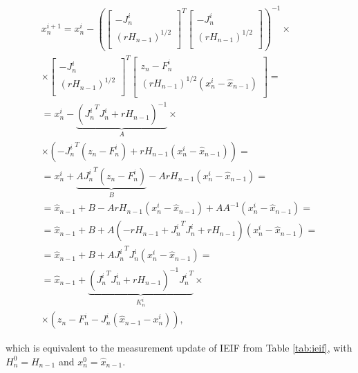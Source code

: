  \begin{align*}
x_n^{i + 1}= x_n^{i} - \left(
\left[
	\begin{array}{cc}
		- J_n^i \\
		\left(r H_{n - 1}\right)^{1/2} \\
	\end{array}
\right]^T 
\left[
	\begin{array}{c}
		- J_n^i \\
		\left(r H_{n - 1}\right)^{1/2} \\
	\end{array}
\right]
\right)^{-1} \times\\
\times \left[
	\begin{array}{cc}
		- J_n^i \\
		\left(r H_{n - 1}\right)^{1/2} \\
	\end{array}
\right]^T 
\left[
	\begin{array}{c}
		z_n - F_n^i \\
		\left(r H_{n - 1}\right)^{1/2}(x_n^i - \hat{x}_{n - 1}) \\
	\end{array}
\right] = \\
= x_n^{i} - \underbrace{\left({J_n^i}^T J_n^i + r H_{n - 1}\right)^{-1}}_{A} \times \\
\times \left( - {J_n^i}^T(z_n - F_n^i) + r H_{n - 1}(x_n^i - \hat{x}_{n - 1})\right)  = \\
= x_n^i +\underbrace{A {J_n^i}^T(z_n - F_n^i)}_B - A r H_{n - 1}(x_n^i - \hat{x}_{n - 1})  = \\
= \hat{x}_{n - 1} + B  - A r H_{n - 1}(x_n^i - \hat{x}_{n - 1}) + A A^{-1}( x_n^i - \hat{x}_{n - 1}) = \\
= \hat{x}_{n - 1} + B + A(- r H_{n - 1} + {J_n^i}^T J_n^i + r H_{n - 1})(x_n^i - \hat{x}_{n - 1}) = \\
= \hat{x}_{n - 1} + B + A {J_n^i}^T J_n^i (x_n^i - \hat{x}_{n - 1}) = \\
= \hat{x}_{n - 1} + \underbrace{\left({J_n^i}^T J_n^i + r H_{n - 1}\right)^{-1} {J_n^i}^T}_{K_n^i} \times \\
\times (z_n - F_n^i - J_n^i (\hat{x}_{n - 1} - x_n^i)),
 \end{align*}
 
 which is equivalent to the measurement update of IEIF from Table \ref{tab:ieif}, with $H_n^0 = H_{n-1}$ and $x_n^0 = \hat{x}_{n - 1}$.
 
